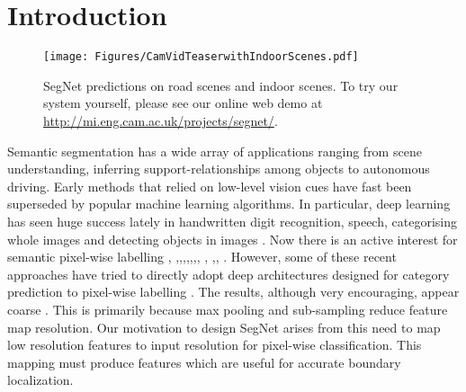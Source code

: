 \documentclass[10pt,journal,compsoc]{IEEEtran}
\begin{document}
\maketitle








\section{Introduction}
\label{sec:introduction}
\begin{figure*}[!t]
\center
\texttt{[image: Figures/CamVidTeaserwithIndoorScenes.pdf]}
\caption{\footnotesize{SegNet predictions on road scenes and indoor scenes. To try our system yourself, please see our online web demo at \url{http://mi.eng.cam.ac.uk/projects/segnet/}. }}
\label{Teaser}
\end{figure*} 

Semantic segmentation has a wide array of applications ranging from scene understanding, inferring support-relationships among objects to autonomous driving. Early methods that relied on low-level vision cues have fast been superseded by popular machine learning algorithms. In particular, deep learning has seen huge success lately in handwritten digit recognition, speech, categorising whole images and detecting objects in images \cite{szegedy2015going, Simonyan}. Now there is an active interest for semantic pixel-wise labelling \cite{FarabetPAMI} \cite{raey},  \cite{socher2011parsing},\cite{FCN},\cite{noh2015learning},\cite{zheng2015conditional},\cite{ParseNetRabinovich},\cite{SegNetarXiv},\cite{eigen2015predicting}, \cite{liang2015semantic}, \cite{papandreou2015weakly},\cite{yu2015multi}, \cite{ronneberger2015u}. 
However, some of these recent approaches have tried to directly adopt deep architectures designed for category prediction to pixel-wise labelling \cite{FarabetPAMI}. The results, although very encouraging, appear coarse \cite{liang2015semantic}. This is primarily because max pooling and sub-sampling reduce feature map resolution. Our motivation to design SegNet arises from this need to map low resolution features to input resolution for pixel-wise classification. This mapping must produce features which are useful for accurate boundary localization. 
\end{document}
